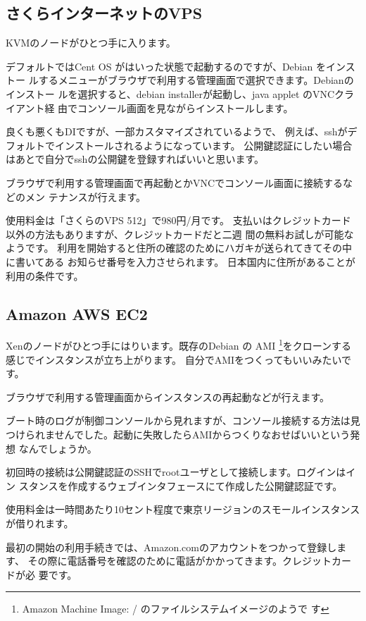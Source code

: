 \documentclass[mingoth,a4paper]{jsarticle}
\begin{document}
\subsection{さくらインターネットのVPS}

KVMのノードがひとつ手に入ります。

デフォルトではCent OS がはいった状態で起動するのですが、Debian をインストー
ルするメニューがブラウザで利用する管理画面で選択できます。Debianのインストー
ルを選択すると、debian installerが起動し、java applet のVNCクライアント経
由でコンソール画面を見ながらインストールします。

良くも悪くもDIですが、一部カスタマイズされているようで、
例えば、sshがデフォルトでインストールされるようになっています。
公開鍵認証にしたい場合はあとで自分でsshの公開鍵を登録すればいいと思います。

ブラウザで利用する管理画面で再起動とかVNCでコンソール画面に接続するなどのメン
テナンスが行えます。

使用料金は「さくらのVPS 512」で980円/月です。
支払いはクレジットカード以外の方法もありますが、クレジットカードだと二週
間の無料お試しが可能なようです。
利用を開始すると住所の確認のためにハガキが送られてきてその中に書いてある
お知らせ番号を入力させられます。
日本国内に住所があることが利用の条件です。

\subsection{Amazon AWS EC2}
Xenのノードがひとつ手にはりいます。既存のDebian の AMI \footnote{Amazon
Machine Image: / のファイルシステムイメージのようで
す}\cite{debianec2image}をクローンする感じでインスタンスが立ち上がります。
自分でAMIをつくってもいいみたいです。

ブラウザで利用する管理画面からインスタンスの再起動などが行えます。

ブート時のログが制御コンソールから見れますが、コンソール接続する方法は見
つけられませんでした。起動に失敗したらAMIからつくりなおせばいいという発想
なんでしょうか。

初回時の接続は公開鍵認証のSSHでrootユーザとして接続します。ログインはイン
スタンスを作成するウェブインタフェースにて作成した公開鍵認証です。

使用料金は一時間あたり10セント程度で東京リージョンのスモールインスタンス
が借りれます。

最初の開始の利用手続きでは、Amazon.comのアカウントをつかって登録します、
その際に電話番号を確認のために電話がかかってきます。クレジットカードが必
要です。
\end{document}

